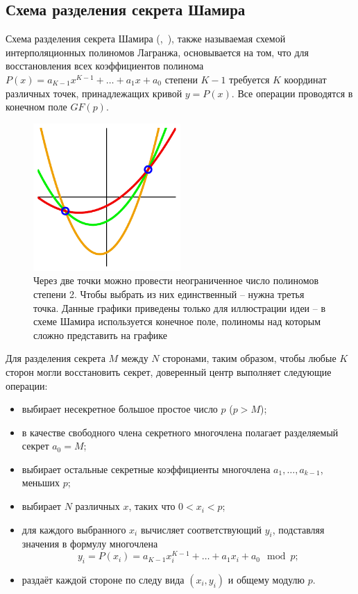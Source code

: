 \subsection[Схема Шамира]{Схема разделения секрета Шамира}

Схема разделения секрета Шамира (,~\cite{Shamir:1979}), также называемая схемой интерполяционных полиномов Лагранжа, основывается на том, что для восстановления всех коэффициентов полинома $P(x) = a_{K-1}x^{K-1} + \dots + a_1 x + a_0$ степени $K-1$ требуется $K$ координат различных точек, принадлежащих кривой $y=P(x)$. Все операции проводятся в конечном поле $GF(p)$.

\begin{figure}[thb]
	\centering
	\includegraphics[width=0.5\textwidth]{pic/shamir}
  \caption{Через две точки можно провести неограниченное число полиномов степени 2. Чтобы выбрать из них единственный -- нужна третья точка. Данные графики приведены только для иллюстрации идеи -- в схеме Шамира используется конечное поле, полиномы над которым сложно представить на графике}
  \label{fig:shamir}
\end{figure}

Для разделения секрета $M$ между $N$ сторонами, таким образом, чтобы любые $K$ сторон могли восстановить секрет, доверенный центр выполняет следующие операции:
\begin{itemize}
	\item выбирает несекретное большое простое число $p$ ($p > M$);
	\item в качестве свободного члена секретного многочлена полагает разделяемый секрет $a_0 = M$;
	\item выбирает остальные секретные коэффициенты многочлена $a_1, \dots, a_{k-1}$, меньших $p$;
	\item выбирает $N$ различных $x$, таких что $0 < x_i < p$;
	\item для каждого выбранного $x_i$ вычисляет соответствующий $y_i$, подставляя значения в формулу многочлена
		\[ y_i = P( x_i ) = a_{K-1}x_i^{K-1} + \dots + a_1 x_i + a_0 \mod p ;\]
	\item раздаёт каждой стороне по следу вида $(x_i, y_i)$ и общему модулю $p$.
\end{itemize}

